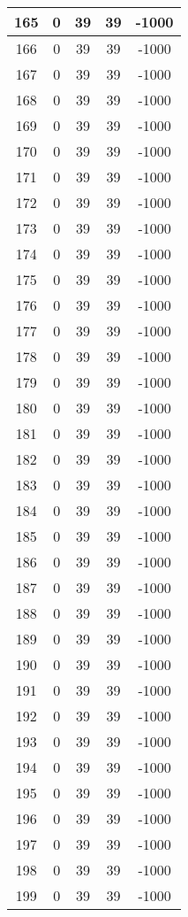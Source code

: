 \documentclass[letterpaper, 12pt]{article}
\begin{document}
\begin{longtable}{|c|c|c|c|c|}
\hline
165 & 0 & 39 & 39 & -1000 \\
\hline
166 & 0 & 39 & 39 & -1000 \\
\hline
167 & 0 & 39 & 39 & -1000 \\
\hline
168 & 0 & 39 & 39 & -1000 \\
\hline
169 & 0 & 39 & 39 & -1000 \\
\hline
170 & 0 & 39 & 39 & -1000 \\
\hline
171 & 0 & 39 & 39 & -1000 \\
\hline
172 & 0 & 39 & 39 & -1000 \\
\hline
173 & 0 & 39 & 39 & -1000 \\
\hline
174 & 0 & 39 & 39 & -1000 \\
\hline
175 & 0 & 39 & 39 & -1000 \\
\hline
176 & 0 & 39 & 39 & -1000 \\
\hline
177 & 0 & 39 & 39 & -1000 \\
\hline
178 & 0 & 39 & 39 & -1000 \\
\hline
179 & 0 & 39 & 39 & -1000 \\
\hline
180 & 0 & 39 & 39 & -1000 \\
\hline
181 & 0 & 39 & 39 & -1000 \\
\hline
182 & 0 & 39 & 39 & -1000 \\
\hline
183 & 0 & 39 & 39 & -1000 \\
\hline
184 & 0 & 39 & 39 & -1000 \\
\hline
185 & 0 & 39 & 39 & -1000 \\
\hline
186 & 0 & 39 & 39 & -1000 \\
\hline
187 & 0 & 39 & 39 & -1000 \\
\hline
188 & 0 & 39 & 39 & -1000 \\
\hline
189 & 0 & 39 & 39 & -1000 \\
\hline
190 & 0 & 39 & 39 & -1000 \\
\hline
191 & 0 & 39 & 39 & -1000 \\
\hline
192 & 0 & 39 & 39 & -1000 \\
\hline
193 & 0 & 39 & 39 & -1000 \\
\hline
194 & 0 & 39 & 39 & -1000 \\
\hline
195 & 0 & 39 & 39 & -1000 \\
\hline
196 & 0 & 39 & 39 & -1000 \\
\hline
197 & 0 & 39 & 39 & -1000 \\
\hline
198 & 0 & 39 & 39 & -1000 \\
\hline
199 & 0 & 39 & 39 & -1000 \\
\hline
\end{longtable}
\end{document}
